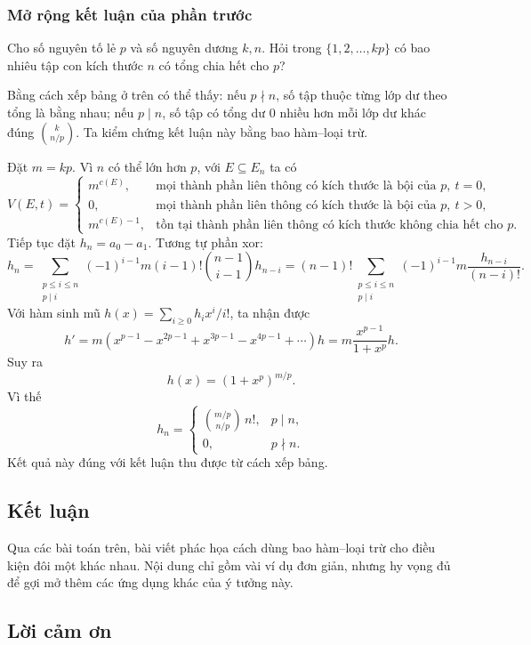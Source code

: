 \documentclass[11pt]{article}
\begin{document}
\subsubsection{Mở rộng kết luận của phần trước}

Cho số nguyên tố lẻ $p$ và số nguyên dương $k,n$. Hỏi trong
\(\{1,2,\ldots,kp\}\) có bao nhiêu tập con kích thước $n$ có tổng chia hết cho
$p$?

Bằng cách xếp bảng ở trên có thể thấy: nếu $p\nmid n$, số tập thuộc từng lớp dư
theo tổng là bằng nhau; nếu $p\mid n$, số tập có tổng dư $0$ nhiều hơn mỗi lớp
dư khác đúng $\binom{k}{n/p}$. Ta kiểm chứng kết luận này bằng bao hàm--loại
trừ.

Đặt $m=kp$. Vì $n$ có thể lớn hơn $p$, với $E\subseteq E_n$ ta có
\[
  V(E,t)=
  \begin{cases}
    m^{c(E)}, & \text{mọi thành phần liên thông có kích thước là bội của }p,\ t=0,\\
    0, & \text{mọi thành phần liên thông có kích thước là bội của }p,\ t>0,\\
    m^{c(E)-1}, & \text{tồn tại thành phần liên thông có kích thước không chia hết cho }p.
  \end{cases}
\]
Tiếp tục đặt $h_n=a_0-a_1$. Tương tự phần xor:
\[
  h_n
  =
  \sum_{\substack{p\le i\le n\\p\mid i}}
  (-1)^{i-1}m(i-1)!\binom{n-1}{i-1}h_{n-i}
  =
  (n-1)!\sum_{\substack{p\le i\le n\\p\mid i}}
  (-1)^{i-1}m\frac{h_{n-i}}{(n-i)!}.
\]
Với hàm sinh mũ $h(x)=\sum_{i\ge 0}h_i x^i/i!$, ta nhận được
\[
  h'=m(x^{p-1}-x^{2p-1}+x^{3p-1}-x^{4p-1}+\cdots)h
  =m\frac{x^{p-1}}{1+x^p}h.
\]
Suy ra
\[
  h(x)=(1+x^p)^{m/p}.
\]
Vì thế
\[
  h_n=
  \begin{cases}
    \binom{m/p}{n/p}\,n!, & p\mid n,\\
    0, & p\nmid n.
  \end{cases}
\]
Kết quả này đúng với kết luận thu được từ cách xếp bảng.

\subsection{Kết luận}

Qua các bài toán trên, bài viết phác họa cách dùng bao hàm--loại trừ cho điều
kiện đôi một khác nhau. Nội dung chỉ gồm vài ví dụ đơn giản, nhưng hy vọng đủ
để gợi mở thêm các ứng dụng khác của ý tưởng này.

\subsection{Lời cảm ơn}
\end{document}
